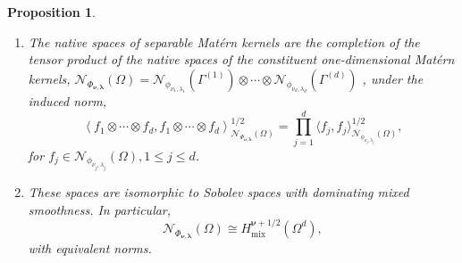 \documentclass[pdflatex,sn-mathphys-num]{sn-jnl}%
\theoremstyle{thmstyleone}%
\newtheorem{proposition}{Proposition}%
\theoremstyle{thmstyletwo}%
\theoremstyle{thmstylethree}%
\begin{document}
\begin{proposition}\label{prop: separable native space isomorph}
\begin{enumerate}[label=(\roman*)]
    \item The native spaces of separable Mat\'ern kernels are the completion of the tensor product of the native spaces of the constituent one-dimensional Mat\'ern kernels, \(\mathcal{N}_{\Phi_{\boldsymbol{\nu},\boldsymbol{\lambda}}}(\Omega)=\mathcal{N}_{\phi_{\nu_1,\lambda_1}}(\Gamma^{(1)})\otimes\cdots\otimes\mathcal{N}_{\phi_{\nu_d,\lambda_d}}(\Gamma^{(d)})\) , under the induced norm,
\[
\left\langle f_1\otimes\cdots\otimes f_d,f_1\otimes\cdots\otimes f_d\right\rangle_{\mathcal{N}_{\Phi_{\boldsymbol{\nu},\boldsymbol{\lambda}}}(\Omega)}^{1/2} = \prod_{j=1}^d\langle f_j,f_j\rangle^{1/2}_{\mathcal{N}_{\phi_{\nu_j,\lambda_j}}\left(\Omega\right)},
\]
for \(f_j\in\mathcal{N}_{\phi_{\nu_j,\lambda_j}}\left(\Omega\right), 1\leq j\leq d\).
\item These spaces are isomorphic to Sobolev spaces with dominating mixed smoothness. In particular,
\[
\mathcal{N}_{\Phi_{\boldsymbol{\nu},\boldsymbol{\lambda}}}(\Omega)\cong H^{\boldsymbol{\nu}+1/2}_{\textrm{mix}}(\Omega^d)
,\]
with equivalent norms.
\end{enumerate}
\end{proposition}
\end{document}

